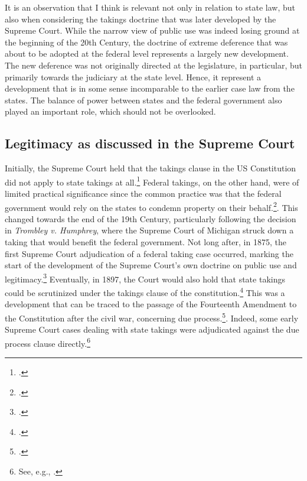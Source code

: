 \documentclass[12pt,a4paper]{book} %
\begin{document}
It is an observation that I think is relevant not only in relation to state law, but also when considering the takings doctrine that was later developed by the Supreme Court. While the narrow view of public use was indeed losing ground at the beginning of the 20th Century, the doctrine of extreme deference that was about to be adopted at the federal level represents a largely new development. The new deference was not originally directed at the legislature, in particular, but primarily towards the judiciary at the state level. Hence, it represent a development that is in some sense incomparable to the earlier case law from the states. The balance of power between states and the federal government also played an important role, which should not be overlooked.

\subsection{Legitimacy as discussed in the Supreme Court}\label{subsec:US}

Initially, the Supreme Court held that the takings clause in the US Constitution did not apply to state takings at all.\footcite{barron33} Federal takings, on the other hand, were of limited practical significance since the common practice was that the federal government would rely on the states to condemn property on their behalf.\footcite[30]{meidinger80}. This changed towards the end of the 19th Century, particularly following the decision in {\it Trombley v. Humphrey}, where the Supreme Court of Michigan struck down a taking that would benefit the federal government.\cite{trombley71} Not long after, in 1875, the first Supreme Court adjudication of a federal taking case occurred, marking the start of the development of the Supreme Court's own doctrine on public use and legitimacy.\footcite{kohl75} Eventually, in 1897, the Court would also hold that state takings could be scrutinized under the takings clause of the constitution.\footcite{chicago97} This was a development that can be traced to the passage of the Fourteenth Amendment to the Constitution after the civil war, concerning due process.\footcite{johnson11}. Indeed, some early Supreme Court cases dealing with state takings were adjudicated against the due process clause directly.\footnote{See, e.g., \cite{head85}.}
\end{document}
